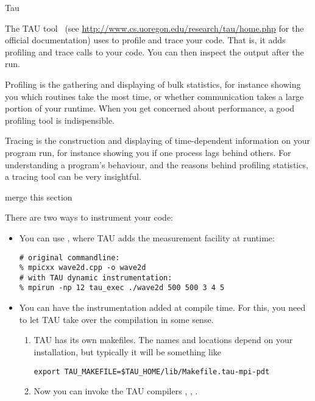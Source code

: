 
 {Tau}
\label{sec:tau}


The TAU tool~\cite{TAU:ijhpca}
(see \url{http://www.cs.uoregon.edu/research/tau/home.php} for the official documentation)
uses  to profile and trace your code. That is, it adds 
profiling and trace calls to your code. You can then inspect
the output after the run.

Profiling is the
gathering and displaying of bulk statistics, for instance showing you
which routines take the most time, or whether communication takes a
large portion of your runtime. When you get concerned about
performance, a good profiling tool is indispensible.

Tracing is the construction and displaying of time-dependent
information on  your program run, for instance showing you if one
process lags behind others. For understanding a program's behaviour,
and the reasons behind profiling statistics, a tracing tool can be
very insightful.

 {merge this section}

There are two ways to instrument your code:
\begin{itemize}
\item You can use , where TAU adds the measurement facility at runtime:
\begin{verbatim}
# original commandline:
% mpicxx wave2d.cpp -o wave2d
# with TAU dynamic instrumentation:
% mpirun -np 12 tau_exec ./wave2d 500 500 3 4 5
\end{verbatim}
\item You can have the instrumentation added at compile time. For
  this, you need to let TAU take over the compilation in some sense.
  \begin{enumerate}
  \item TAU has its own makefiles. The names and locations depend on
    your installation, but typically it will be something like
\begin{verbatim}
export TAU_MAKEFILE=$TAU_HOME/lib/Makefile.tau-mpi-pdt
\end{verbatim}
  \item Now you can invoke the TAU compilers , , .
  \end{enumerate}
\end{itemize}

